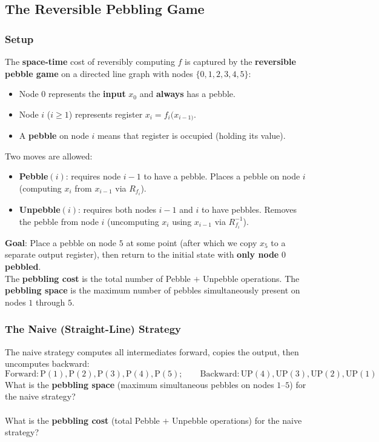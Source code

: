 \newpage
\subsection{The Reversible Pebbling Game}
\subsubsection{Setup}
The \textbf{space-time} cost of reversibly computing $f$ is captured by the \textbf{reversible pebble game} on a directed line graph with nodes $\{0,1,2,3,4,5\}$:
\begin{itemize}
    \item Node $0$ represents the \textbf{input} $x_0$ and \textbf{always} has a pebble.
    \item Node $i$ ($i \geq 1$) represents register $x_i = f_i(x_{i-1)}$.
    \item A \textbf{pebble} on node $i$ means that register is occupied (holding its value).
\end{itemize}

Two moves are allowed:
\begin{itemize}
    \item \textbf{Pebble}$(i)$: requires node $i-1$  to have a pebble. Places a pebble on node $i$ (computing $x_i$ from $x_{i-1}$ via $R_{f_i}$).
    \item \textbf{Unpebble}$(i)$: requires both nodes $i-1$ and $i$ to have pebbles. Removes the pebble from node $i$ (uncomputing $x_i$ using $x_{i-1}$ via $R_{f_i}^{-1}$).
\end{itemize}
\textbf{Goal}: Place a pebble on node $5$ at some point (after which we copy $x_5$ to a separate output register), then return to the initial state with \textbf{only node} $0$ \textbf{pebbled}.\\

The \textbf{pebbling cost} is the total number of Pebble $+$ Unpebble operations. The \textbf{pebbling space} is the maximum number of pebbles simultaneously present on nodes $1$ through $5$.


\subsubsection{The Naive (Straight-Line) Strategy}
The naive strategy computes all intermediates forward, copies the output, then uncomputes backward:
\begin{equation}
    \mathrm{Forward: P(1), P(2), P(3), P(4), P(5);} \qquad \mathrm{Backward: UP(4), UP(3), UP(2), UP(1)}
\end{equation}
What is the \textbf{pebbling space} (maximum simultaneous pebbles on nodes $1$–$5$) for the naive strategy? \\
\noindent{} 
\newline \\
What is the \textbf{pebbling cost} (total Pebble $+$ Unpebble operations) for the naive strategy? \\
\noindent{} 

